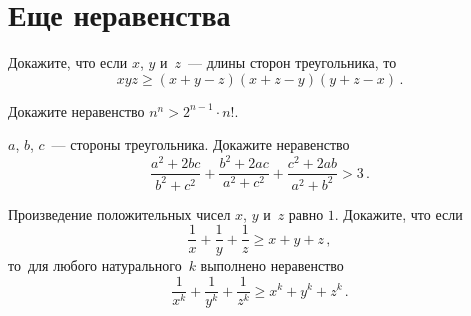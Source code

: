 
\section*{Еще неравенства}


\begin{problems}

\item
Докажите, что если $x$, $y$ и~$z$~--- длины сторон треугольника, то
\[
    x y z
\geq
    (x + y - z) (x + z - y) (y + z - x)
\, . \]

\item
Докажите неравенство $n^{n} > 2^{n-1} \cdot n!$.

\item
$a$, $b$, $c$~--- стороны треугольника.
Докажите неравенство
\[
    \frac{a^2 + 2 b c}{b^2 + c^2} +
    \frac{b^2 + 2 a c}{a^2 + c^2} +
    \frac{c^2 + 2 a b}{a^2 + b^2} > 3
\, . \]

\item
Произведение положительных чисел $x$, $y$ и~$z$ равно $1$.
Докажите, что если
\[
    \frac{1}{x} + \frac{1}{y} + \frac{1}{z}
\geq
    x + y + z
\, , \]
то~для любого натурального~$k$ выполнено неравенство
\[
    \frac{1}{x^k} + \frac{1}{y^k} + \frac{1}{z^k}
\geq
    x^k + y^k + z^k
\, . \]

\end{problems}

